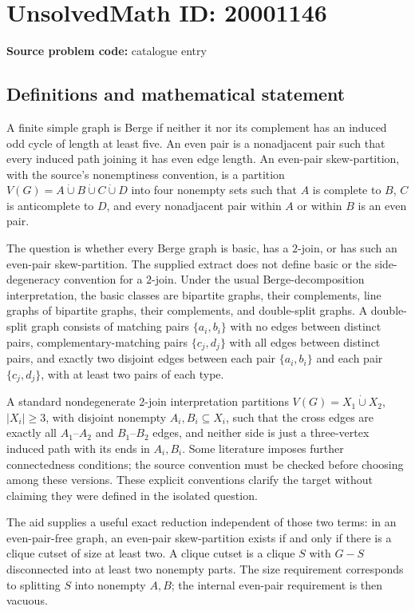 \documentclass[11pt]{article}
\begin{document}
\section*{UnsolvedMath ID: 20001146}
\textbf{Source problem code:} catalogue entry
\subsection{Definitions and mathematical statement}
A finite simple graph is Berge if neither it nor its complement has an induced odd cycle of length at least five. An even pair is a nonadjacent pair such that every induced path joining it has even edge length. An even-pair skew-partition, with the source's nonemptiness convention, is a partition $V(G)=A\mathbin{\dot\cup}B\mathbin{\dot\cup}C\mathbin{\dot\cup}D$ into four nonempty sets such that $A$ is complete to $B$, $C$ is anticomplete to $D$, and every nonadjacent pair within $A$ or within $B$ is an even pair.

The question is whether every Berge graph is basic, has a $2$-join, or has such an even-pair skew-partition. The supplied extract does not define basic or the side-degeneracy convention for a $2$-join. Under the usual Berge-decomposition interpretation, the basic classes are bipartite graphs, their complements, line graphs of bipartite graphs, their complements, and double-split graphs. A double-split graph consists of matching pairs $\{a_i,b_i\}$ with no edges between distinct pairs, complementary-matching pairs $\{c_j,d_j\}$ with all edges between distinct pairs, and exactly two disjoint edges between each pair $\{a_i,b_i\}$ and each pair $\{c_j,d_j\}$, with at least two pairs of each type.

A standard nondegenerate $2$-join interpretation partitions $V(G)=X_1\mathbin{\dot\cup}X_2$, $|X_i|\geq3$, with disjoint nonempty $A_i,B_i\subseteq X_i$, such that the cross edges are exactly all $A_1$--$A_2$ and $B_1$--$B_2$ edges, and neither side is just a three-vertex induced path with its ends in $A_i,B_i$. Some literature imposes further connectedness conditions; the source convention must be checked before choosing among these versions. These explicit conventions clarify the target without claiming they were defined in the isolated question.

The aid supplies a useful exact reduction independent of those two terms: in an even-pair-free graph, an even-pair skew-partition exists if and only if there is a clique cutset of size at least two. A clique cutset is a clique $S$ with $G-S$ disconnected into at least two nonempty parts. The size requirement corresponds to splitting $S$ into nonempty $A,B$; the internal even-pair requirement is then vacuous.
\end{document}
